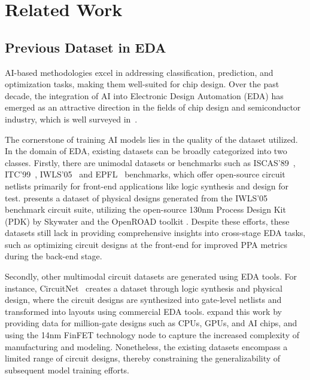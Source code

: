 \section{Related Work}
\label{Sec:Related}
\subsection{Previous Dataset in EDA}
AI-based methodologies excel in addressing classification, prediction, and optimization tasks, making them well-suited for chip design. Over the past decade, the integration of AI into Electronic Design Automation (EDA) has emerged as an attractive direction in the fields of chip design and semiconductor industry, which is well surveyed in~\cite{huang2021machine, chen2024dawn}. 

The cornerstone of training AI models lies in the quality of the dataset utilized. In the domain of EDA, existing datasets can be broadly categorized into two classes. Firstly, there are unimodal datasets or benchmarks such as ISCAS'89~\cite{ISCAS89}, ITC'99~\cite{ITC99}, IWLS'05~\cite{IWLS05} and EPFL~\cite{EPFLBenchmarks} benchmarks, which offer open-source circuit netlists primarily for front-end applications like logic synthesis and design for test. \cite{shrestha2024edaschema} presents a dataset of physical designs generated from the IWLS'05 benchmark circuit suite, utilizing the open-source 130nm Process Design Kit (PDK) by Skywater and the OpenROAD toolkit \cite{ajayi2019openroad}. 
Despite these efforts, these datasets still lack in providing comprehensive insights into cross-stage EDA tasks, such as optimizing circuit designs at the front-end for improved PPA metrics during the back-end stage.

Secondly, other multimodal circuit datasets are generated using EDA tools. For instance, CircuitNet~\cite{chai2022circuitnet, jiang2024circuitnet2} creates a dataset through logic synthesis and physical design, where the circuit designs are synthesized into gate-level netlists and transformed into layouts using commercial EDA tools. \cite{jiang2024circuitnet2} expand this work by providing data for million-gate designs such as CPUs, GPUs, and AI chips, and using the 14nm FinFET technology node to capture the increased complexity of manufacturing and modeling. Nonetheless, the existing datasets encompass a limited range of circuit designs, thereby constraining the generalizability of subsequent model training efforts. 

